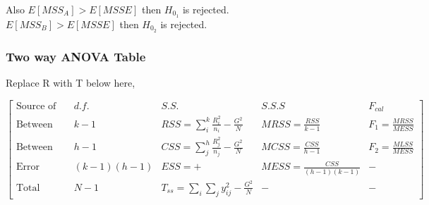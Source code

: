 \documentclass[oneside,11pt,pdftex]{book}%
\numberwithin{equation}{section}
\numberwithin{section}{chapter}
\numberwithin{equation}{chapter}
\begin{document}
Also $ E[MSS_A]>E[MSSE] $ then $ H_{0_1} $ is rejected.\\
$ E[MSS_B]>E[MSSE] $ then $ H_{0_2} $ is rejected.

\subsubsection{Two way ANOVA Table}
Replace R with T below here,

\[ \begin{bmatrix}
	\text{Source of variance} & d.f. & S.S. & S.S.S & F_{cal}\\
	\text{Between factor A} & k-1 & RSS=\sum_i^k \frac{R_i^2}{n_i}-\frac{G^2}{N} & MRSS=\frac{RSS}{k-1} & F_1=\frac{MRSS}{MESS}\\
	\text{Between factor B} & h-1 & CSS=\sum_j^h \frac{R_j^2}{n_j}-\frac{G^2}{N} & MCSS=\frac{CSS}{h-1} & F_2=\frac{MLSS}{MESS}\\
	\text{Error} & (k-1)(h-1) & ESS=+ & MESS=\frac{CSS}{(h-1)(k-1)} & -\\
	\text{Total} & N-1 & T_{ss}=\sum_i \sum_j y_{ij}^2-\frac{G^2}{N} & - & -
\end{bmatrix} \]


\backmatter


\thispagestyle{empty}%
{\ }
\newpage
\end{document}
